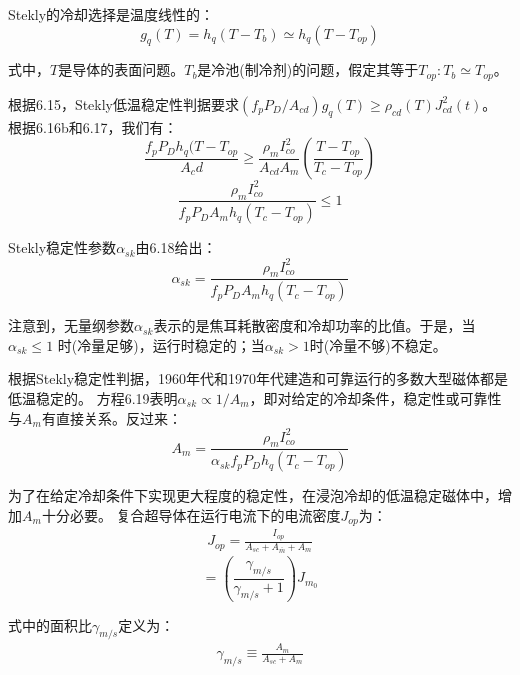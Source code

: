 Stekly的冷却选择是温度线性的：
\begin{equation}%
g_q(T)=h_q(T-T_b)\simeq h_q(T-T_{op})
\end{equation}

式中，$T$是导体的表面问题。$T_b$是冷池(制冷剂)的问题，假定其等于$T_{op}:T_b\simeq T_{op}$。

根据6.15，Stekly低温稳定性判据要求$(f_p P_D/A_{cd})g_q(T)\ge \rho_{cd}(T)J_{cd}^2(t)$。
根据6.16b和6.17，我们有：
\begin{equation*}%
\frac{f_pP_Dh_q(T-T_{op}}{A_cd}\geq \frac{\rho_m I_{co}^2}{A_{cd}A_m}(\frac{T-T_{op}}{T_c-T_{op}})
\end{equation*}
\begin{equation}%
\frac{\rho_m I_{co}^2}{f_pP_DA_mh_q(T_c-T_{op})}\leq 1
\end{equation}

Stekly稳定性参数$\alpha_{sk}$由6.18给出：
\begin{equation}%
\alpha_{sk}=\frac{\rho_m I_{co}^2}{f_pP_DA_mh_q(T_c-T_{op})}
\end{equation}

注意到，无量纲参数$\alpha_{sk}$表示的是焦耳耗散密度和冷却功率的比值。于是，当$\alpha_{sk}\le 1$
时(冷量足够)，运行时稳定的；当$\alpha_{sk}> 1$时(冷量不够)不稳定。

根据Stekly稳定性判据，1960年代和1970年代建造和可靠运行的多数大型磁体都是低温稳定的。
方程6.19表明$\alpha_{sk}\propto 1/A_m$，即对给定的冷却条件，稳定性或可靠性与$A_m$有直接关系。反过来：
\begin{equation}%
A_m=\frac {\rho_mI_{co}^2}{\alpha_{sk}f_pP_Dh_q(T_c-T_{op})}
\end{equation}

为了在给定冷却条件下实现更大程度的稳定性，在浸泡冷却的低温稳定磁体中，增加$A_m$十分必要。
复合超导体在运行电流下的电流密度$J_{op}$为：
\begin{align*}%
J_{op}=\frac{I_{op}}{A_{sc}+A_ {\bar{m}}+A_m}\tag{6.6}
\end{align*}
\begin{equation}%
=(\frac{\gamma_{m/s}}{\gamma_{m/s}+1})J_{m_0}
\end{equation}

式中的面积比$\gamma_{m/s}$定义为：
\begin{align*}%
\gamma_{m/s}\equiv \frac{A_m}{A_{sc}+A_m}
\end{align*}

